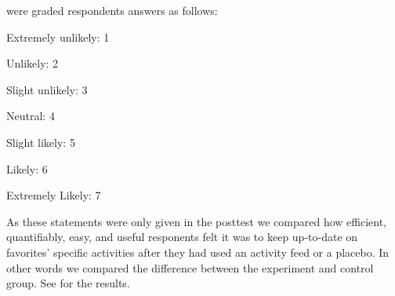 were graded respondents answers as follows: 

\begin{items}
  \item Extremely unlikely: 1
  \item Unlikely: 2
  \item Slight unlikely: 3
  \item Neutral: 4
  \item Slight likely: 5
  \item Likely: 6
  \item Extremely Likely: 7
\end{items}

As these statements were only given in the
posttest we compared how efficient, quantifiably, easy, and useful responents
felt it was to
keep up-to-date on favorites' specific activities after they had used
an activity feed or a placebo. In other words we compared the difference
between the experiment and control group.
See
 for the results.

